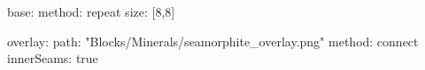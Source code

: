 base:
  method: repeat
  size: [8,8]

overlay:
  path: "Blocks/Minerals/seamorphite_overlay.png"
  method: connect
  innerSeams: true